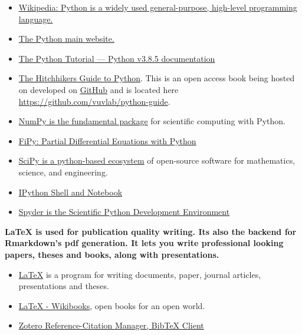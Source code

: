 \documentclass[10pt]{article} %
\begin{document}
      \begin{itemize}
        \item \href{"https://en.wikipedia.org/wiki/Python_(programming_language)"}{Wikipedia: Python is a widely used general-purpose, high-level programming language.}  \cite{python_python_2014}
        \item \href{"https://www.python.org/"}{The Python main website.} \cite{python_python.org_2013}
        \item \href{"https://docs.python.org/3/tutorial/index.html"}{The Python Tutorial — Python v3.8.5 documentation}  \cite{python_python_2014}
        \item \href{"http://docs.python-guide.org/en/latest/"}{The Hitchhikers Guide to Python}. This is an open access book being hosted on developed on \href{"https://github.com/"}{GitHub} and is located here \href{"https://github.com/vuvlab/python-guide"}{https://github.com/vuvlab/python-guide}. \cite{_hitchhikers_2014} \cite{_kennethreitz/python-guide_2014}
        \item \href{"http://www.numpy.org"}{NumPy is the fundamental package} \cite{numpy_numpy_2014} for scientific computing with Python.
        \item \href{"http://www.ctcms.nist.gov/fipy/"}{FiPy: Partial Differential Equations with Python} \cite{guyer_fipy:_2009}
        \item \href{"http://www.scipy.org/"}{SciPy is a python-based ecosystem}  \cite{scipy_scipy.org_2014} of open-source software for mathematics, science, and engineering.
        \item \href{"http://ipython.org/index.html"}{IPython Shell and Notebook}  \cite{ipython_ipython_2014}
        \item \href{"https://code.google.com/p/spyderlib/"}{Spyder is the Scientific Python Development Environment}  \cite{spyder_spyder_2014}
      \end{itemize}

    {\bf LaTeX is used for publication quality writing. Its also the backend for Rmarkdown's pdf generation. It lets you write professional looking papers, theses and books, along with presentations. }
      \begin{itemize}
        \item \href{"http://www.tug.org/"}{LaTeX} is a program for writing documents, paper, journal articles, presentations and theses. \cite{_tex_2014}
        \item \href{"http://en.wikibooks.org/wiki/LaTeX"}{LaTeX - Wikibooks}, open books for an open world. \cite{latex_latex_2014}
        \item \href{"https://www.zotero.org/"}{Zotero Reference-Citation Manager, BibTeX Client}  \cite{zotero_zotero_2014}
      \end{itemize}
\end{document}
